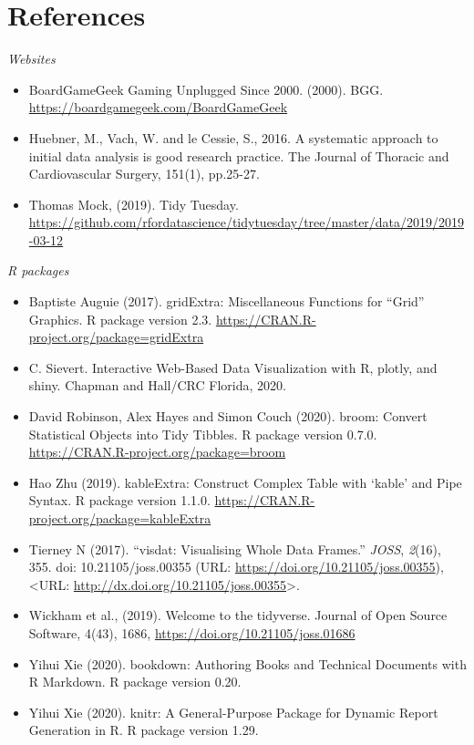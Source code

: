 \documentclass[
]{article}
\begin{document}
\hypertarget{references}{%
\section{References}\label{references}}

\emph{Websites}

\begin{itemize}
\item
  BoardGameGeek \textbar{} Gaming Unplugged Since 2000. (2000). BGG. \url{https://boardgamegeek.com/BoardGameGeek}
\item
  Huebner, M., Vach, W. and le Cessie, S., 2016. A systematic approach to initial data analysis is good research practice. The Journal of Thoracic and Cardiovascular Surgery, 151(1), pp.25-27.
\item
  Thomas Mock, (2019). Tidy Tuesday. \url{https://github.com/rfordatascience/tidytuesday/tree/master/data/2019/2019-03-12}
\end{itemize}

\emph{R packages}

\begin{itemize}
\item
  Baptiste Auguie (2017). gridExtra: Miscellaneous Functions for ``Grid'' Graphics. R
  package version 2.3. \url{https://CRAN.R-project.org/package=gridExtra}
\item
  C. Sievert. Interactive Web-Based Data Visualization with R, plotly, and shiny. Chapman
  and Hall/CRC Florida, 2020.
\item
  David Robinson, Alex Hayes and Simon Couch (2020). broom: Convert Statistical Objects
  into Tidy Tibbles. R package version 0.7.0. \url{https://CRAN.R-project.org/package=broom}
\item
  Hao Zhu (2019). kableExtra: Construct Complex Table with `kable' and Pipe Syntax. R
  package version 1.1.0. \url{https://CRAN.R-project.org/package=kableExtra}
\item
  Tierney N (2017). ``visdat: Visualising Whole Data Frames.'' \emph{JOSS}, \emph{2}(16), 355. doi:
  10.21105/joss.00355 (URL: \url{https://doi.org/10.21105/joss.00355}), \textless URL:
  \url{http://dx.doi.org/10.21105/joss.00355}\textgreater.
\item
  Wickham et al., (2019). Welcome to the tidyverse. Journal of Open Source Software, 4(43),
  1686, \url{https://doi.org/10.21105/joss.01686}
\item
  Yihui Xie (2020). bookdown: Authoring Books and Technical Documents with R Markdown. R
  package version 0.20.
\item
  Yihui Xie (2020). knitr: A General-Purpose Package for Dynamic Report Generation in R. R
  package version 1.29.
\end{itemize}
\end{document}
